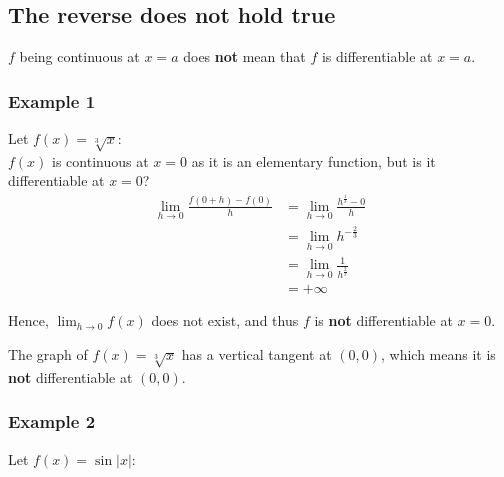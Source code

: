 \documentclass[11pt]{article}
\begin{document}
\newpage

\subsection{The reverse does not hold true}
\label{sec:org91f4252}
\(f\) being continuous at \(x = a\) does \textbf{not} mean that \(f\) is differentiable at \(x = a\).

\subsubsection{Example 1}
\label{sec:org9728bcd}
Let \(f(x) = \sqrt[3]{x}\):
\\[0pt]

\(f(x)\) is continuous at \(x = 0\) as it is an elementary function, but is it differentiable at \(x = 0\)?
\begin{align*}
\lim_{h \rightarrow 0} \frac{f(0 + h) - f(0)}{h} &= \lim_{h \rightarrow 0} \frac{h^{\frac{1}{3}} - 0}{h} \\
&= \lim_{h \rightarrow 0} h^{-\frac{2}{3}} \\
&= \lim_{h \rightarrow 0} \frac{1}{h^{\frac{2}{3}}} \\
&= + \infty
\end{align*}

Hence, \(\lim_{h \rightarrow 0} f(x)\) does not exist, and thus \(f\) is \textbf{not} differentiable at \(x = 0\).
\\[0pt]

\begin{center}
\end{center}

The graph of \(f(x) = \sqrt[3]{x}\) has a vertical tangent at \((0, 0)\), which means it is \textbf{not} differentiable at \((0, 0)\).

\newpage

\subsubsection{Example 2}
\label{sec:org64adcc6}
Let \(f(x) = \sin |x|\):
\\[0pt]
\end{document}
